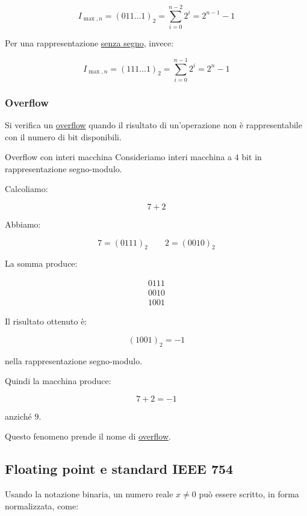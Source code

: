 \documentclass{article}
\begin{document}
$$
    I_{\max,n}
    =
    (011\dots1)_2
    =
    \sum_{i=0}^{n-2}2^i
    =
    2^{n-1}-1
$$

Per una rappresentazione \underline{senza segno}, invece:

$$
    I_{\max,n}
    =
    (111\dots1)_2
    =
    \sum_{i=0}^{n-1}2^i
    =
    2^n-1
$$

\subsubsection{Overflow}

Si verifica un \underline{overflow} quando il risultato di un'operazione non è rappresentabile con il numero di bit disponibili.

\begin{ex}{Overflow con interi macchina}{}
    Consideriamo interi macchina a $4$ bit in rappresentazione segno-modulo.

    Calcoliamo:

    $$
        7+2
    $$

    Abbiamo:

    $$
        7=(0111)_2
        \qquad
        2=(0010)_2
    $$

    La somma produce:

    $$
        \begin{array}{c}
            0111 \\
            0010 \\
            \hline
            1001
        \end{array}
    $$

    Il risultato ottenuto è:

    $$
        (1001)_2=-1
    $$

    nella rappresentazione segno-modulo.

    Quindi la macchina produce:

    $$
        \boxed{7+2=-1}
    $$

    anziché $9$.

    Questo fenomeno prende il nome di \underline{overflow}.
\end{ex}

\subsection{Floating point e standard IEEE 754}

Usando la notazione binaria, un numero reale $x\neq0$ può essere scritto, in forma normalizzata, come:
\end{document}
